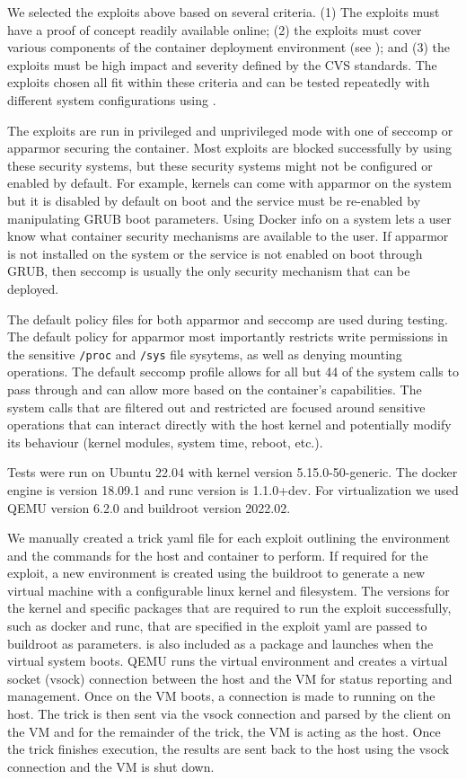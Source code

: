 We selected the exploits above based on several criteria. (1) The exploits must have a proof of concept readily available online; (2) the exploits must cover various components of the container deployment environment (see ); and (3) the exploits must be high impact and severity defined by the CVS standards. The exploits chosen all fit within these criteria and can be tested repeatedly with different system configurations using \houdini.

The exploits are run in privileged and unprivileged mode with one of seccomp or apparmor securing the container. Most exploits are blocked successfully by using these security systems, but these security systems might not be configured or enabled by default. For example, kernels can come with apparmor on the system but it is disabled by default on boot and the service must be re-enabled by manipulating GRUB boot parameters. Using Docker info on a system lets a user know what container security mechanisms are available to the user. If apparmor is not installed on the system or the service is not enabled on boot through GRUB, then seccomp is usually the only security mechanism that can be deployed.

The default policy files for both apparmor and seccomp are used during testing. The default policy for apparmor most importantly restricts write permissions in the sensitive \texttt{/proc} and \texttt{/sys} file sysytems, as well as denying mounting operations. The default seccomp profile allows for all but 44 of the system calls to pass through and can allow more based on the container's capabilities. The system calls that are filtered out and restricted are focused around sensitive operations that can interact directly with the host kernel and potentially modify its behaviour (kernel modules, system time, reboot, etc.).

Tests were run on Ubuntu 22.04 with kernel version 5.15.0-50-generic. The docker engine is version 18.09.1 and runc version is 1.1.0+dev. For virtualization we used QEMU version 6.2.0 and buildroot version 2022.02.

We manually created a trick yaml file for each exploit outlining the environment and the commands for the host and container to perform. If required for the exploit, a new environment is created using the buildroot to generate a new virtual machine with a configurable linux kernel and filesystem. The versions for the kernel and specific packages that are required to run the exploit successfully, such as docker and runc, that are specified in the exploit yaml are passed to buildroot as parameters. \houdini is also included as a package and launches when the virtual system boots. QEMU runs the virtual environment and creates a virtual socket (vsock) connection between the host and the VM for status reporting and management. Once \houdini on the VM boots, a connection is made to \houdini running on the host. The trick is then sent via the vsock connection and parsed by the \houdini client on the VM and for the remainder of the trick, the VM is acting as the host. Once the trick finishes execution, the results are sent back to the host \houdini using the vsock connection and the VM is shut down.

